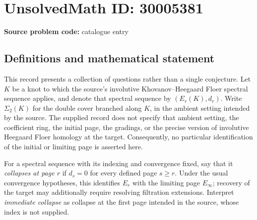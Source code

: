 \documentclass[11pt]{article}
\begin{document}
\section*{UnsolvedMath ID: 30005381}
\textbf{Source problem code:} catalogue entry
\subsection{Definitions and mathematical statement}
This record presents a collection of questions rather than a single conjecture. Let \(K\) be a knot to which the source's involutive Khovanov--Heegaard Floer spectral sequence applies, and denote that spectral sequence by \((E_r(K),d_r)\). Write \(\Sigma_2(K)\) for the double cover branched along \(K\), in the ambient setting intended by the source. The supplied record does not specify that ambient setting, the coefficient ring, the initial page, the gradings, or the precise version of involutive Heegaard Floer homology at the target. Consequently, no particular identification of the initial or limiting page is asserted here.

For a spectral sequence with its indexing and convergence fixed, say that it \emph{collapses at page \(r\)} if \(d_s=0\) for every defined page \(s\ge r\). Under the usual convergence hypotheses, this identifies \(E_r\) with the limiting page \(E_\infty\); recovery of the target may additionally require resolving filtration extensions. Interpret \emph{immediate collapse} as collapse at the first page intended in the source, whose index is not supplied.
\end{document}
